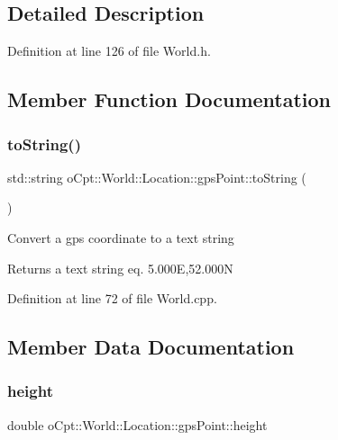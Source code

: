 \subsection{Detailed Description}


Definition at line 126 of file World.\+h.



\subsection{Member Function Documentation}
\hypertarget{structo_cpt_1_1_world_1_1_location_1_1gps_point_a6274bfccaa6be97f2146ab7805ada0af}{}\label{structo_cpt_1_1_world_1_1_location_1_1gps_point_a6274bfccaa6be97f2146ab7805ada0af} 
\subsubsection{\texorpdfstring{to\+String()}{toString()}}
{\footnotesize\ttfamily std\+::string o\+Cpt\+::\+World\+::\+Location\+::gps\+Point\+::to\+String (\begin{DoxyParamCaption}{ }\end{DoxyParamCaption})}

Convert a gps coordinate to a text string \begin{DoxyReturn}{Returns}
a text string eq. 5.\+000E,52.\+000N 
\end{DoxyReturn}


Definition at line 72 of file World.\+cpp.



\subsection{Member Data Documentation}
\hypertarget{structo_cpt_1_1_world_1_1_location_1_1gps_point_a94635e1477d9136f9cbb54fa8fa1fa39}{}\label{structo_cpt_1_1_world_1_1_location_1_1gps_point_a94635e1477d9136f9cbb54fa8fa1fa39} 
\subsubsection{\texorpdfstring{height}{height}}
{\footnotesize\ttfamily double o\+Cpt\+::\+World\+::\+Location\+::gps\+Point\+::height}



